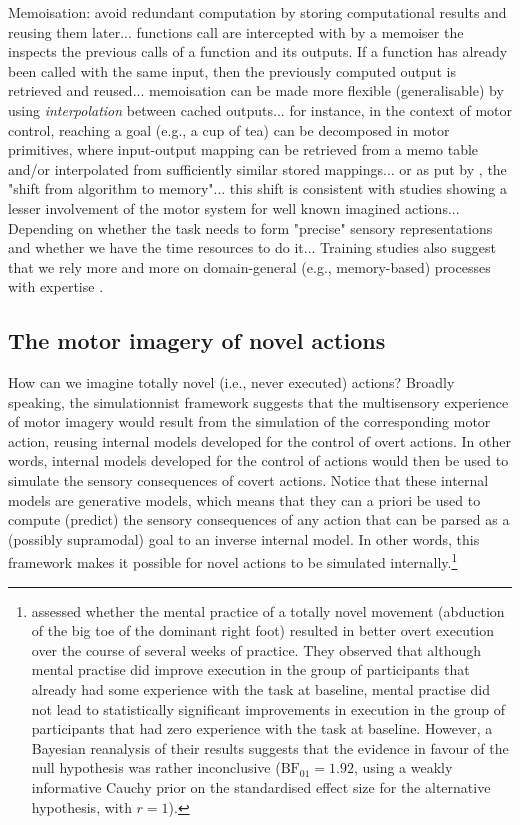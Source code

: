 \documentclass[utf8]{template/frontiersSCNS} %
\begin{document}
Memoisation: avoid redundant computation by storing computational results and reusing them later... functions call are intercepted with by a memoiser the inspects the previous calls of a function and its outputs. If a function has already been called with the same input, then the previously computed output is retrieved and reused... memoisation can be made more flexible (generalisable) by using \textit{interpolation} between cached outputs... for instance, in the context of motor control, reaching a goal (e.g., a cup of tea) can be decomposed in motor primitives, where input-output mapping can be retrieved from a memo table and/or interpolated from sufficiently similar stored mappings... or as put by \cite{dasgupta_memory_2021}, the "shift from algorithm to memory"... this shift is consistent with studies showing a lesser involvement of the motor system for well known imagined actions... Depending on whether the task needs to form "precise" sensory representations and whether we have the time resources to do it... Training studies also suggest that we rely more and more on domain-general (e.g., memory-based) processes with expertise \citep[e.g.,][]{tarr_mental_1989, jolicoeur_time_1985}.

\subsection{The motor imagery of novel actions}

How can we imagine totally novel (i.e., never executed) actions? Broadly speaking, the simulationnist framework suggests that the multisensory experience of motor imagery would result from the simulation of the corresponding motor action, reusing internal models developed for the control of overt actions. In other words, internal models developed for the control of actions would then be used to simulate the sensory consequences of covert actions. Notice that these internal models are generative models, which means that they can a priori be used to compute (predict) the sensory consequences of any action that can be parsed as a (possibly supramodal) goal to an inverse internal model. In other words, this framework makes it possible for novel actions to be simulated internally.\footnote{\cite{mulder_role_2004} assessed whether the mental practice of a totally novel movement (abduction of the big toe of the dominant right foot) resulted in better overt execution over the course of several weeks of practice. They observed that although mental practise did improve execution in the group of participants that already had some experience with the task at baseline, mental practise did not lead to statistically significant improvements in execution in the group of participants that had zero experience with the task at baseline. However, a Bayesian reanalysis of their results suggests that the evidence in favour of the null hypothesis was rather inconclusive ($\text{BF}_{01} = 1.92$, using a weakly informative Cauchy prior on the standardised effect size for the alternative hypothesis, with $r = 1$).}
\end{document}
